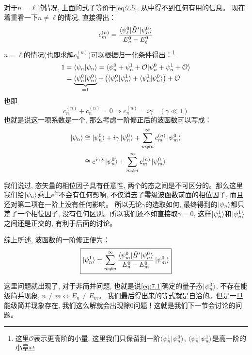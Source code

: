 \documentclass[a4paper,zihao=-4,linespread=1]{ctexrep}
\newenvironment{lequation}{\large\begin{equation}}{\end{equation}}
\begin{document}
    对于$n=\ell$的情况, 上面的式子等价于\ref{eq:7.5}, 从中得不到任何有用的信息。
    现在着重看一下$n\neq\ell$的情况, 直接得出：
    \[c_m^{(n)}=\frac{\braket{\psi_\ell^0|\hat{H}^\prime|\psi_n^0}}{E_n^0-E^0_\ell}\]
    $n=\ell$的情况(也即求解$c_n^{(n)}$)可以根据归一化条件得出：\footnote{这里$\mathcal{O}$表示更高阶的小量, 这里我们只保留到一阶$\braket{\psi_n^1|\psi_n^0}$, $\braket{\psi_n^1|\psi_n^1}$是高一阶的小量}
    \begin{align*}
        1&=\braket{\psi_n|\psi_n}=\braket{\psi_n^0+\psi_n^1+\mathcal{O}|\psi_n^0+\psi_n^1+\mathcal{O}}\\
        &=\underbrace{\braket{\psi_n^0|\psi_n^0}}_{=1}+\left(\braket{\psi_n^0|\psi_n^1}+\braket{\psi_n^1|\psi_n^0}\right)+\mathcal{O}
    \end{align*}
    也即$$\bar{c}_n^{(n)}+c_n^{(n)}=0\Rightarrow c_n^{(n)}=i\gamma\quad\left(\gamma\ll 1\right)$$ 
    也就是说这一项系数是一个, 那么考虑一阶修正后的波函数可以写成：
    \begin{align*}
        \ket{\psi_n}&\cong \ket{\psi_n^0}+i\gamma\ket{\psi_n^0}+\sum\limits_{m\neq n}^\infty c_m^{(n)}\ket{\psi_m^0}\\
        &\cong e^{i\gamma\lambda}\ket{\psi_n^0}+\sum\limits_{m\neq n}^\infty c_m^{(n)}\ket{\psi_m^0}
    \end{align*}

    我们说过, 态矢量的相位因子具有任意性, 两个的态之间是不可区分的。那么这里我们给$\ket{\psi_n}$乘上$e^{i\gamma}$不会有任何影响, 不仅消去了零级波函数前面的相位因子, 而且还对第二项在一阶上没有任何影响。
    所以无论$\gamma$的选取如何, 最终得到的$\ket{\psi_n}$都只差了一个相位因子, 没有任何区别。所以我们还不如直接取$\gamma=0$, 这样$\ket{\psi_n^1}$和$\ket{\psi_n^1}$之间还是正交的, 有利于后面的讨论。
    
    综上所述, 波函数的一阶修正便为：
    \begin{lequation}
        \label{eq:7.9}
        \boxed{
            \ket{\psi_n^1}=\sum\limits_{m\neq n}^\infty \frac{\braket{\psi_m^0|\hat{H}^\prime|\psi_n^0}}{E_n^0-E^0_m}\ket{\psi_m^0}
        }
    \end{lequation}
    
    这里问题就出现了, 对于非简并问题, 也就是说\ref{eq:7.1}确定的量子态$\ket{\psi_n^0}$, 不存在能级简并现象, $n \neq m \Leftrightarrow E_n\neq E_m$。
    我们最后得出来的等式就是自洽的。但是一旦能级简并现象存在, 我们这么解就会出现除0问题！这就是我们下一节会讨论的问题。
\end{document}
